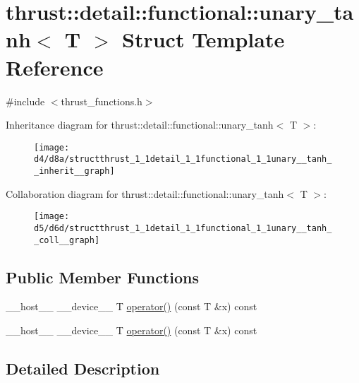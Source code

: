 \hypertarget{structthrust_1_1detail_1_1functional_1_1unary__tanh}{}\section{thrust\+:\+:detail\+:\+:functional\+:\+:unary\+\_\+tanh$<$ T $>$ Struct Template Reference}
\label{structthrust_1_1detail_1_1functional_1_1unary__tanh}


{\ttfamily \#include $<$thrust\+\_\+functions.\+h$>$}



Inheritance diagram for thrust\+:\+:detail\+:\+:functional\+:\+:unary\+\_\+tanh$<$ T $>$\+:
\nopagebreak
\begin{figure}[H]
\begin{center}
\leavevmode
\texttt{[image: d4/d8a/structthrust\_1\_1detail\_1\_1functional\_1\_1unary\_\_tanh\_\_inherit\_\_graph]}
\end{center}
\end{figure}


Collaboration diagram for thrust\+:\+:detail\+:\+:functional\+:\+:unary\+\_\+tanh$<$ T $>$\+:
\nopagebreak
\begin{figure}[H]
\begin{center}
\leavevmode
\texttt{[image: d5/d6d/structthrust\_1\_1detail\_1\_1functional\_1\_1unary\_\_tanh\_\_coll\_\_graph]}
\end{center}
\end{figure}
\subsection*{Public Member Functions}
\begin{DoxyCompactItemize}
\item 
\+\_\+\+\_\+host\+\_\+\+\_\+ \+\_\+\+\_\+device\+\_\+\+\_\+ T \hyperlink{structthrust_1_1detail_1_1functional_1_1unary__tanh_a2a2f7add2127d833fc62273f35d4eecc}{operator()} (const T \&x) const 
\item 
\+\_\+\+\_\+host\+\_\+\+\_\+ \+\_\+\+\_\+device\+\_\+\+\_\+ T \hyperlink{structthrust_1_1detail_1_1functional_1_1unary__tanh_a2a2f7add2127d833fc62273f35d4eecc}{operator()} (const T \&x) const 
\end{DoxyCompactItemize}


\subsection{Detailed Description}
